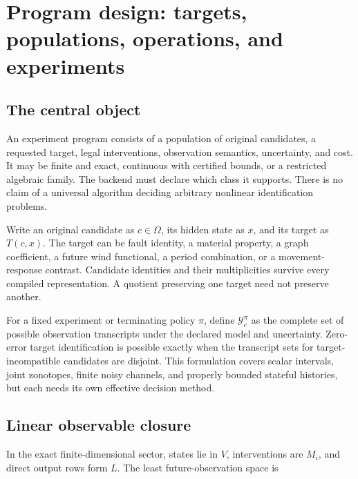\documentclass[
  11pt,
  a4paper,
]{report}
\begin{document}
\hypertarget{program-design-targets-populations-operations-and-experiments}{%
\chapter{Program design: targets, populations, operations, and
experiments}\label{program-design-targets-populations-operations-and-experiments}}

\hypertarget{the-central-object}{%
\section{The central object}\label{the-central-object}}

An experiment program consists of a population of original candidates, a
requested target, legal interventions, observation semantics,
uncertainty, and cost. It may be finite and exact, continuous with
certified bounds, or a restricted algebraic family. The backend must
declare which class it supports. There is no claim of a universal
algorithm deciding arbitrary nonlinear identification problems.

Write an original candidate as \(c\in\Omega\), its hidden state as
\(x\), and its target as \(T(c,x)\). The target can be fault identity, a
material property, a graph coefficient, a future wind functional, a
period combination, or a movement-response contrast. Candidate
identities and their multiplicities survive every compiled
representation. A quotient preserving one target need not preserve
another.

For a fixed experiment or terminating policy \(\pi\), define
\(\mathcal Y_c^\pi\) as the complete set of possible observation
transcripts under the declared model and uncertainty. Zero-error target
identification is possible exactly when the transcript sets for
target-incompatible candidates are disjoint. This formulation covers
scalar intervals, joint zonotopes, finite noisy channels, and properly
bounded stateful histories, but each needs its own effective decision
method.

\hypertarget{linear-observable-closure}{%
\section{Linear observable closure}\label{linear-observable-closure}}

In the exact finite-dimensional sector, states lie in \(V\),
interventions are \(M_i\), and direct output rows form \(L\). The least
future-observation space is
\end{document}
